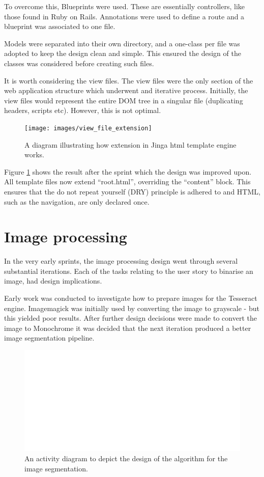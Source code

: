 To overcome this, Blueprints were used. These are essentially controllers, like those found in Ruby on Rails. Annotations were used to define a route and a blueprint was associated to one file.

Models were separated into their own directory, and a one-class per file was adopted to keep the design clean and simple. This ensured the design of the classes was considered before creating such files.

It is worth considering the view files. The view files were the only section of the web application structure which underwent and iterative process. Initially, the view files would represent the entire DOM tree in a singular file (duplicating headers, scripts etc). However, this is not optimal.

\begin{figure}[h]
  \centering
  \texttt{[image: images/view\_file\_extension]}
  \caption{A diagram illustrating how extension in Jinga html template engine works.}
  \label{fig:extension}
\end{figure}

Figure \ref{fig:extension} shows the result after the sprint which the design was improved upon. All template files now extend ``root.html'', overriding the ``content'' block. This ensures that the do not repeat yourself (DRY) principle is adhered to and HTML, such as the navigation, are only declared once.
\section{Image processing}
In the very early sprints, the image processing design went through several substantial iterations. Each of the tasks relating to the user story to binarise an image, had design implications.

Early work was conducted to investigate how to prepare images for the Tesseract engine. Imagemagick was initially used by converting the image to grayscale - but this yielded poor results. After further design decisions were made to convert the image to Monochrome it was decided that the next iteration produced a better image segmentation pipeline.

\begin{figure}[h]
  \centering
  \includegraphics[scale=0.5]{images/image_binarisation_activity.pdf}
  \caption{An activity diagram to depict the design of the algorithm for the image segmentation.}
  \label{fig:activity_binarise}
\end{figure}

